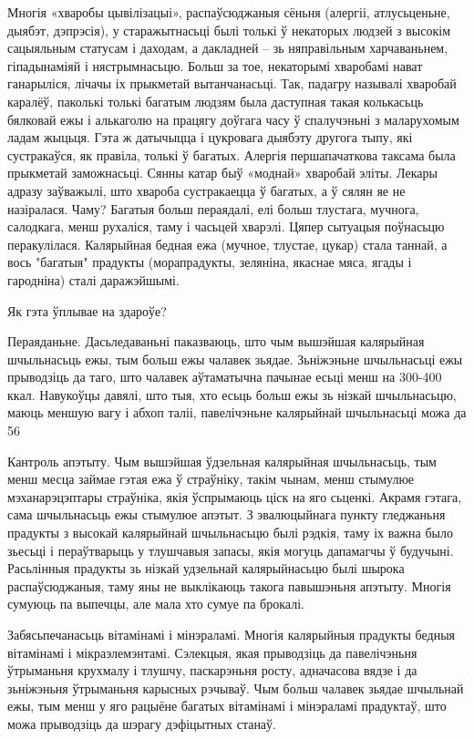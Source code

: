 Многія «хваробы цывілізацыі», распаўсюджаныя сёньня (алергіі, атлусьценьне, дыябэт, дэпрэсія), у старажытнасьці былі толькі ў некаторых людзей з высокім сацыяльным статусам і даходам, а дакладней – зь няправільным харчаваньнем, гіпадынаміяй і нястрымнасьцю. Больш за тое, некаторымі хваробамі нават ганарыліся, лічачы іх прыкметай вытанчанасьці. Так, падагру называлі хваробай каралёў, паколькі толькі багатым людзям была даступная такая колькасьць бялковай ежы і алькаголю на працягу доўгага часу ў спалучэньні з маларухомым ладам жыцьця. Гэта ж датычыцца і цукровага дыябэту другога тыпу, які сустракаўся, як правіла, толькі ў багатых. Алергія першапачаткова таксама была прыкметай заможнасьці. Сянны катар быў «моднай» хваробай эліты. Лекары адразу заўважылі, што хвароба сустракаецца ў багатых, а ў сялян яе не назіралася. Чаму? Багатыя больш пераядалі, елі больш тлустага, мучнога, салодкага, менш рухаліся, таму і часьцей хварэлі. Цяпер сытуацыя поўнасьцю перакулілася. Калярыйная бедная ежа (мучное, тлустае, цукар) стала таннай, а вось "багатыя" прадукты (морапрадукты, зеляніна, якаснае мяса, ягады і гародніна) сталі даражэйшымі.

Як гэта ўплывае на здароўе?

Пераяданьне.
Дасьледаваньні паказваюць, што чым вышэйшая калярыйная шчыльнасьць ежы, тым больш ежы чалавек зьядае. Зьніжэньне шчыльнасьці ежы прыводзіць да таго, што чалавек аўтаматычна пачынае есьці менш на 300-400 ккал. Навукоўцы давялі, што тыя, хто есьць больш ежы зь нізкай шчыльнасьцю, маюць меншую вагу і абхоп таліі, павелічэньне калярыйнай шчыльнасьці можа да 56%

Кантроль апэтыту.
Чым вышэйшая ўдзельная калярыйная шчыльнасьць, тым менш месца займае гэтая ежа ў страўніку, такім чынам, менш стымулюе мэханарэцэптары страўніка, якія ўспрымаюць ціск на яго сьценкі. Акрамя гэтага, сама шчыльнасьць ежы стымулюе апэтыт. З эвалюцыйнага пункту гледжаньня прадукты з высокай калярыйнай шчыльнасьцю былі рэдкія, таму іх важна было зьесьці і пераўтварыць у тлушчавыя запасы, якія могуць дапамагчы ў будучыні. Расьлінныя прадукты зь нізкай удзельнай калярыйнасьцю былі шырока распаўсюджаныя, таму яны не выклікаюць такога павышэньня апэтыту. Многія сумуюць па выпечцы, але мала хто сумуе па брокалі.

Забясьпечанасьць вітамінамі і мінэраламі.
Многія калярыйныя прадукты бедныя вітамінамі і мікраэлемэнтамі. Сэлекцыя, якая прыводзіць да павелічэньня ўтрыманьня крухмалу і тлушчу, паскарэньня росту, адначасова вядзе і да зьніжэньня ўтрыманьня карысных рэчываў. Чым больш чалавек зьядае шчыльнай ежы, тым менш у яго рацыёне багатых вітамінамі і мінэраламі прадуктаў, што можа прыводзіць да шэрагу дэфіцытных станаў.


